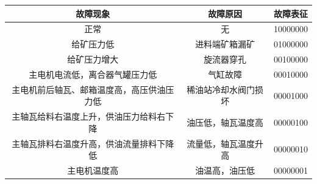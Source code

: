 \documentclass{ctacn}%
\begin{document}
\begin{center}
	\renewcommand\tabcolsep{12.6pt}%
	\label{tab1}
	\renewcommand\tabcolsep{10pt}
	\begin{tabular}{ccc}\toprule
	故障现象&故障原因&故障表征\\
	\hline
	正常&无&10000000\\
	给矿压力低&进料端矿箱漏矿&01000000\\
	给矿压力增大&旋流器穿孔&00100000\\
	主电机电流低，离合器气罐压力低&气缸故障&00010000\\
	主电机前后轴瓦、邮箱温度高，高压供油压力低&稀油站冷却水阀门损坏&00001000\\
	主轴瓦给料右温度上升，供油压力给料右下降&油压低，轴瓦温度高&00000100\\
	主轴瓦排料右温度升高，供油流量排料下降低&流量低，轴瓦温度升高&00000010\\
	主电机温度高&油温高，油压低&00000001\\
	\bottomrule
	\end{tabular}
\end{center}
\end{document}
